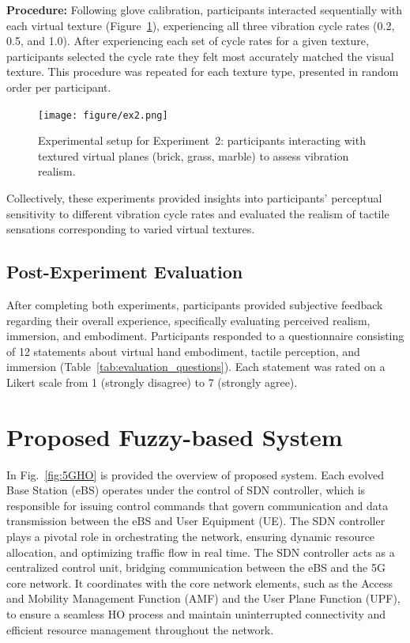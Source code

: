 \documentclass[graybox]{svmult}
\begin{document}
\textbf{Procedure:} Following glove calibration, participants interacted sequentially with each virtual texture (Figure~\ref{fig:experiment2_setup}), experiencing all three vibration cycle rates (0.2, 0.5, and 1.0). After experiencing each set of cycle rates for a given texture, participants selected the cycle rate they felt most accurately matched the visual texture. This procedure was repeated for each texture type, presented in random order per participant.

\begin{figure}\centering
	\texttt{[image: figure/ex2.png]}%
	\caption{Experimental setup for Experiment~2: participants interacting with textured virtual planes (brick, grass, marble) to assess vibration realism.}\label{fig:experiment2_setup}
\end{figure}

Collectively, these experiments provided insights into participants' perceptual sensitivity to different vibration cycle rates and evaluated the realism of tactile sensations corresponding to varied virtual textures.

\subsection{Post-Experiment Evaluation}
After completing both experiments, participants provided subjective feedback regarding their overall experience, specifically evaluating perceived realism, immersion, and embodiment. Participants responded to a questionnaire consisting of 12 statements about virtual hand embodiment, tactile perception, and immersion (Table~\ref{tab:evaluation_questions}). Each statement was rated on a Likert scale from 1 (strongly disagree) to 7 (strongly agree).



\section{Proposed Fuzzy-based System}\label{sec:proposed}

In Fig.~\ref{fig:5GHO} is provided the overview of proposed system. Each evolved Base Station (eBS) operates under the control of SDN controller, which is responsible for issuing control commands that govern communication and data transmission between the eBS and User Equipment (UE). The SDN controller plays a pivotal role in orchestrating the network, ensuring dynamic resource allocation, and optimizing traffic flow in real time. The SDN controller acts as a centralized control unit, bridging communication between the eBS and the 5G core network. It coordinates with the core network elements, such as the Access and Mobility Management Function (AMF) and the User Plane Function (UPF), to ensure a seamless HO process and maintain uninterrupted connectivity and efficient resource management throughout the network.
\end{document}
